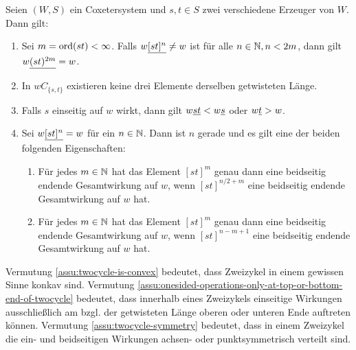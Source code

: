 \begin{assu}
Seien $(W,S)$ ein Coxetersystem und $s,t \in S$ zwei verschiedene Erzeuger
von $W$. Dann gilt:
\begin{enumerate}
  \item \label{assu:max-twocycle-length} Sei $m = \operatorname{ord} (st) < \infty$. Falls
  $w \underline{[st]^n} \neq w$ ist für alle $n \in \mathbb{N}, n < 2m$, dann gilt $w \underline{(st)^{2m}} = w$.
  \item \label{assu:twocycle-is-convex} In $wC_{\{s,t\}}$ existieren keine drei
  Elemente derselben getwisteten Länge.
  \item \label{assu:onesided-operations-only-at-top-or-bottom-end-of-twocycle}
  Falls $s$ einseitig auf $w$ wirkt, dann gilt $w \underline{st} < w \underline{s}$ oder $w
  \underline{t} > w$.
  \item \label{assu:twocycle-symmetry} Sei $w \underline{[st]^n} = w$ für ein $n \in
  \mathbb{N}$. Dann ist $n$ gerade und es gilt eine der beiden folgenden Eigenschaften:
  	\begin{enumerate}
  	  \item Für jedes $m \in \mathbb{N}$ hat das Element $[st]^m$ genau dann eine
  	  beidseitig endende Gesamtwirkung auf $w$, wenn $[st]^{n/2+m}$ eine beidseitig endende
  	  Gesamtwirkung auf $w$ hat.
  	  \item Für jedes $m \in \mathbb{N}$ hat das Element $[st]^m$ genau dann eine
  	  beidseitig endende Gesamtwirkung auf $w$, wenn $[st]^{n-m+1}$ eine beidseitig endende
  	  Gesamtwirkung auf $w$ hat.
  	\end{enumerate}
\end{enumerate}
\end{assu}

\begin{rema}
	Vermutung \ref{assu:twocycle-is-convex} bedeutet, dass Zweizykel in einem
	gewissen Sinne konkav sind. Vermutung
	\ref{assu:onesided-operations-only-at-top-or-bottom-end-of-twocycle} bedeutet,
	dass innerhalb eines Zweizykels einseitige Wirkungen ausschließlich am
	bzgl. der getwisteten Länge oberen oder unteren Ende auftreten können.
	Vermutung \ref{assu:twocycle-symmetry} bedeutet, dass in einem Zweizykel die
	ein- und beidseitigen Wirkungen achsen- oder punktsymmetrisch verteilt sind.
\end{rema}

